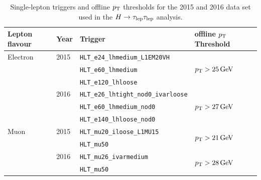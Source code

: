 \begin{table}[htpb]
    \centering
    \caption{Single-lepton triggers and offline $p_\text{T}$ thresholds for the 2015 and 2016 data set used in the $H \to \tau_\text{lep} \tau_\text{lep}$ analysis.}\label{tab:event_selection:trigger:single}
    \begin{tabular}{@{}llll@{}}
        \toprule
        Lepton flavour & Year & Trigger & offline $p_\text{T}$ Threshold \\ \midrule
        Electron       & 2015 & \texttt{HLT\_e24\_lhmedium\_L1EM20VH} & \multirow{3}{*}{$\pt > \SI{25}{\GeV}$} \\
                       &      & \texttt{HLT\_e60\_lhmedium} \\
                       &      & \texttt{HLT\_e120\_lhloose} \\ \cmidrule(l){2-4}
                       & 2016 & \texttt{HLT\_e26\_lhtight\_nod0\_ivarloose} & \multirow{3}{*}{$\pt > \SI{27}{\GeV}$} \\
                       &      & \texttt{HLT\_e60\_lhmedium\_nod0} \\
                       &      & \texttt{HLT\_e140\_lhloose\_nod0} \\ \midrule
        Muon           & 2015 & \texttt{HLT\_mu20\_iloose\_L1MU15} & \multirow{2}{*}{$\pt > \SI{21}{\GeV}$} \\
                       &      & \texttt{HLT\_mu50} \\ \cmidrule(l){2-4}
                       & 2016 & \texttt{HLT\_mu26\_ivarmedium} & \multirow{2}{*}{$\pt > \SI{28}{\GeV}$} \\
                       &      & \texttt{HLT\_mu50} \\
        \bottomrule
    \end{tabular}
\end{table}

